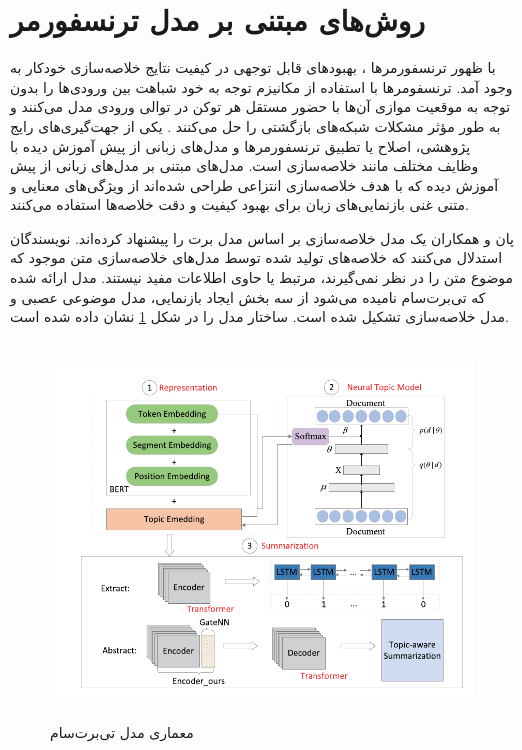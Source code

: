 \section{روش‌های مبتنی بر مدل ترنسفورمر‌}
با ظهور ترنسفورمرها
، بهبودهای قابل توجهی در کیفیت نتایج خلاصه‌سازی خودکار به وجود آمد. ترنسفومرها با استفاده از مکانیزم توجه به خود
شباهت بین ورودی‌ها را بدون توجه به موقعیت موازی آن‌ها با حضور مستقل هر توکن در توالی ورودی مدل می‌کنند و به طور مؤثر مشکلات شبکه‌های بازگشتی را حل می‌کنند \cite{vaswani2017attention}. یکی از جهت‌گیری‌های رایج پژوهشی، اصلاح یا تطبیق ترنسفورمرها و مدل‌های زبانی از پیش آموزش دیده با وظایف مختلف مانند خلاصه‌سازی است. مدل‌های مبتنی بر مدل‌های زبانی از پیش آموزش دیده که با هدف خلاصه‌سازی انتزاعی طراحی شده‌اند از ویژگی‌های معنایی و متنی غنی بازنمایی‌های زبان برای بهبود کیفیت و دقت خلاصه‌‌ها استفاده می‌کنند.



پان
و همکاران یک مدل خلاصه‌سازی بر اساس مدل برت را پیشنهاد کرده‌اند. نویسندگان استدلال می‌کنند که خلاصه‌های تولید شده توسط مدل‌های خلاصه‌سازی متن موجود که موضوع متن را در نظر نمی‌گیرند، مرتبط یا حاوی اطلاعات مفید نیستند. 
مدل ارائه شده که تی‌برت‌سام
نامیده می‌شود از سه بخش ایجاد بازنمایی، مدل موضوعی عصبی
و مدل خلاصه‌سازی تشکیل شده است. ساختار مدل را در شکل \ref{fig:tBert_model} نشان داده شده است.
\begin{figure}[!h]
	\begin{center}
		\includegraphics[height=10cm]{tbertsum_framework.png}
	\end{center}
	\caption{معماری مدل تی‌برت‌سام \cite{Ma2022TBERTSumTT}}
	\label{fig:tBert_model}
	\medskip
	\small
\end{figure}



